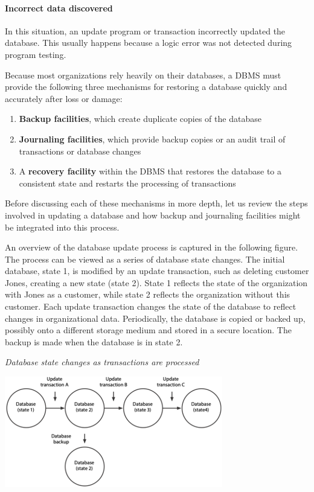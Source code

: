 \documentclass[
]{article}
\begin{document}
\hypertarget{incorrect-data-discovered}{%
\paragraph*{Incorrect data discovered}\label{incorrect-data-discovered}}

In this situation, an update program or transaction incorrectly updated
the database. This usually happens because a logic error was not
detected during program testing.

Because most organizations rely heavily on their databases, a DBMS must
provide the following three mechanisms for restoring a database quickly
and accurately after loss or damage:

\begin{enumerate}
\def\labelenumi{\arabic{enumi}.}
\item
  \textbf{Backup facilities}, which create duplicate copies of the database
\item
  \textbf{Journaling facilities}, which provide backup copies or an audit
  trail of transactions or database changes
\item
  A \textbf{recovery facility} within the DBMS that restores the database
  to a consistent state and restarts the processing of transactions
\end{enumerate}

Before discussing each of these mechanisms in more depth, let us review
the steps involved in updating a database and how backup and journaling
facilities might be integrated into this process.

An overview of the database update process is captured in the following
figure. The process can be viewed as a series of database state changes.
The initial database, state 1, is modified by an update transaction,
such as deleting customer Jones, creating a new state (state 2). State 1
reflects the state of the organization with Jones as a customer, while
state 2 reflects the organization without this customer. Each update
transaction changes the state of the database to reflect changes in
organizational data. Periodically, the database is copied or backed up,
possibly onto a different storage medium and stored in a secure
location. The backup is made when the database is in state 2.

\emph{Database state changes as transactions are processed}

\includegraphics{Figures/Chapter 23/state-changes.png}
\end{document}
